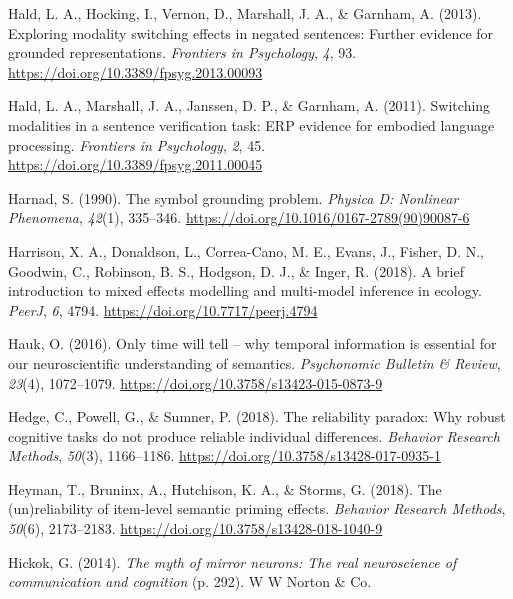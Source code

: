 \documentclass[
  12pt,
  man,floatsintext]{apa7}
\newlength{\cslhangindent}
\newlength{\cslentryspacingunit} %
\newenvironment{CSLReferences}[2] %
 {%
  \setlength{\parindent}{0pt}
  \ifodd #1
  \let\oldpar\par
  \def\par{\hangindent=\cslhangindent\oldpar}
  \fi
  \setlength{\parskip}{#2\cslentryspacingunit}
 }%
 {}
\begin{document}
\begin{CSLReferences}{1}{0}
\leavevmode{}%
Hald, L. A., Hocking, I., Vernon, D., Marshall, J. A., \& Garnham, A. (2013). Exploring modality switching effects in negated sentences: {Further} evidence for grounded representations. \emph{Frontiers in Psychology}, \emph{4}, 93. \url{https://doi.org/10.3389/fpsyg.2013.00093}

\leavevmode{}%
Hald, L. A., Marshall, J. A., Janssen, D. P., \& Garnham, A. (2011). Switching modalities in a sentence verification task: {ERP} evidence for embodied language processing. \emph{Frontiers in Psychology}, \emph{2}, 45. \url{https://doi.org/10.3389/fpsyg.2011.00045}

\leavevmode{}%
Harnad, S. (1990). The symbol grounding problem. \emph{Physica D: Nonlinear Phenomena}, \emph{42}(1), 335--346. \url{https://doi.org/10.1016/0167-2789(90)90087-6}

\leavevmode{}%
Harrison, X. A., Donaldson, L., Correa-Cano, M. E., Evans, J., Fisher, D. N., Goodwin, C., Robinson, B. S., Hodgson, D. J., \& Inger, R. (2018). A brief introduction to mixed effects modelling and multi-model inference in ecology. \emph{PeerJ}, \emph{6}, 4794. \url{https://doi.org/10.7717/peerj.4794}

\leavevmode{}%
Hauk, O. (2016). Only time will tell -- why temporal information is essential for our neuroscientific understanding of semantics. \emph{Psychonomic Bulletin \& Review}, \emph{23}(4), 1072--1079. \url{https://doi.org/10.3758/s13423-015-0873-9}

\leavevmode{}%
Hedge, C., Powell, G., \& Sumner, P. (2018). The reliability paradox: {Why} robust cognitive tasks do not produce reliable individual differences. \emph{Behavior Research Methods}, \emph{50}(3), 1166--1186. \url{https://doi.org/10.3758/s13428-017-0935-1}

\leavevmode{}%
Heyman, T., Bruninx, A., Hutchison, K. A., \& Storms, G. (2018). The (un)reliability of item-level semantic priming effects. \emph{Behavior Research Methods}, \emph{50}(6), 2173--2183. \url{https://doi.org/10.3758/s13428-018-1040-9}

\leavevmode{}%
Hickok, G. (2014). \emph{The myth of mirror neurons: {The} real neuroscience of communication and cognition} (p. 292). {W W Norton \& Co}.


\end{CSLReferences}
\end{document}
